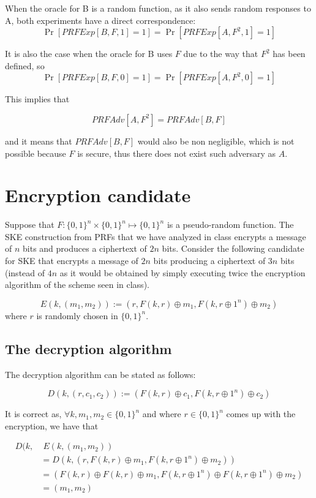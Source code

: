 \documentclass{article}
\newcommand{\bit}[1]{\{0,1\}^{#1}}
\newcommand{\xor}{\oplus}
\begin{document}
When the oracle for B is a random function, as it also sends random 
responses to A, both experiments have a direct correspondence:
$$\Pr[PRFExp[B,F,1]=1]=\Pr[PRFExp[A,F^2,1]=1]$$

It is also the case when the oracle for B uses $F$ due to the way 
that $F^2$ has been defined, so
$$\Pr[PRFExp[B,F,0]=1]=\Pr[PRFExp[A,F^2,0]=1]$$

This implies that

$$
PRFAdv[A,F^2] = PRFAdv[B,F]
$$

and it means that $PRFAdv[B,F]$ would also be non negligible, which is 
not possible because $F$ is secure, thus there does not exist such 
adversary as $A$. 

\section{Encryption candidate}

Suppose that $F: \bit{n} \times \bit{n} \mapsto\bit{n}$ is a
pseudo-random function. The SKE construction from PRFs that we have analyzed
in class encrypts a message of $n$ bits and produces a ciphertext of $2n$ bits.
Consider the following candidate for SKE that encrypts a message of $2n$ bits
producing a ciphertext of $3n$ bits
(instead of $4n$ as it would be obtained by simply executing
twice the encryption algorithm of the scheme seen in class).

$$E(k, (m_1, m_2)) := (r, F(k, r) \xor m_1, F(k, r \xor 1^{n}) \xor m_2)$$
where $r$ is randomly chosen in $\bit{n}$.

\subsection{The decryption algorithm}

The decryption algorithm can be stated as follows:

$$D(k, (r, c_1, c_2)) := (F(k, r) \xor c_1, F(k, r \xor 1^{n}) \xor c_2)$$

It is correct as, $\forall k,m_1,m_2 \in \bit{n}$ and where 
$r \in \bit{n}$ comes up with the encryption, we have that

\begin{align*}
D(k, & \;E(k, (m_1, m_2)) \\  &=
D(k, (r,F(k, r) \xor m_1, F(k, r \xor 1^{n}) \xor m_2)) \\ &=
  (
    F(k, r) \xor F(k, r) \xor m_1, 
    F(k, r \xor 1^{n}) \xor F(k, r \xor 1^{n}) \xor m_2
  ) \\ &=
  (m_1, m_2)
\end{align*}
\end{document}
